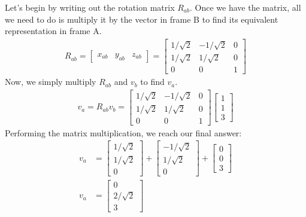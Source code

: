 \documentclass[oneside]{book}
\begin{document}
Let's begin by writing out the rotation matrix $R_{ab}$. Once we have the matrix, all we need to do is multiply it by the vector in frame B to find its equivalent representation in frame A.
\begin{align}
    R_{ab} = \begin{bmatrix}
    x_{ab} & y_{ab} & z_{ab}
    \end{bmatrix}
    = \begin{bmatrix}
    1/\sqrt{2}& -1/\sqrt{2} & 0\\
    1/\sqrt{2} & 1/\sqrt{2} & 0\\
    0 & 0 & 1
    \end{bmatrix}
\end{align}
Now, we simply multiply $R_{ab}$ and $v_b$ to find $v_a$.
\begin{align}
    v_a = R_{ab}v_b = \begin{bmatrix}
    1/\sqrt{2}& -1/\sqrt{2} & 0\\
    1/\sqrt{2} & 1/\sqrt{2} & 0\\
    0 & 0 & 1
    \end{bmatrix}
    \begin{bmatrix}
    1\\
    1\\
    3
    \end{bmatrix}
\end{align}
Performing the matrix multiplication, we reach our final answer:
\begin{align}
    v_a &= \begin{bmatrix}
    1/\sqrt{2}\\
    1/\sqrt{2}\\
    0
    \end{bmatrix} +
    \begin{bmatrix}
    -1/\sqrt{2}\\
    1/\sqrt{2}\\
    0
    \end{bmatrix} +
    \begin{bmatrix}
    0\\
    0\\
    3
    \end{bmatrix}\\
    v_a &= \begin{bmatrix}
    0\\
    2/\sqrt{2}\\
    3
    \end{bmatrix}
\end{align}
\end{document}
